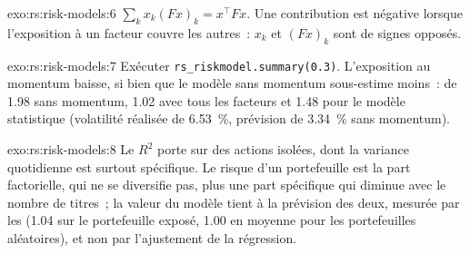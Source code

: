 \begin{solution}{exo:rs:risk-models:6}
$\sum_k x_k (Fx)_k = x^\top F x$. Une contribution est négative lorsque l'exposition à un facteur couvre les autres~: $x_k$ et $(Fx)_k$ sont de signes opposés.
\end{solution}

\begin{solution}{exo:rs:risk-models:7}
Exécuter \texttt{rs\_riskmodel.summary(0.3)}. L'exposition au momentum baisse, si bien que le modèle sans momentum sous-estime moins~:  de 1.98
sans momentum, 1.02 avec tous les facteurs et 1.48 pour le modèle statistique (volatilité réalisée de 6.53~\%, prévision de 3.34~\% sans momentum).
\end{solution}

\begin{solution}{exo:rs:risk-models:8}
Le $R^2$ porte sur des actions isolées, dont la variance quotidienne est surtout spécifique. Le risque d'un portefeuille est la part factorielle, qui ne se diversifie pas, plus une part spécifique qui
diminue avec le nombre de titres~; la valeur du modèle tient à la prévision des deux, mesurée par les  (1.04 sur le portefeuille exposé, 1.00 en moyenne pour les portefeuilles aléatoires),
et non par l'ajustement de la régression.
\end{solution}


